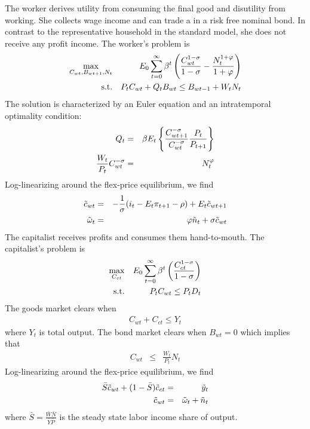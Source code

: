 The worker derives utility from consuming the final good and disutility from working. She collects wage income and can trade a in a risk free nominal bond. In contrast to the representative household in the standard model, she does not receive any profit income. The worker's problem is
\begin{eqnarray}
\max_{C_{wt}, B_{wt+1}, N_t} && E_0 \sum_{t=0}^{\infty} \beta^t \left( \frac{C_{wt}^{1-\sigma}}{1-\sigma}-\frac{N_t^{1+\varphi}}{1+\varphi}\right) \nonumber \\
\lb{worker_bc}
\text{s.t.} && P_t C_{wt} + Q_{t} B_{wt} \leq B_{wt-1} + W_t N_t \nonumber
\end{eqnarray} 
The solution is characterized by an Euler equation and an intratemporal optimality condition:
\begin{eqnarray}
\lb{wc_euler}
Q_{t} &=& \beta E_t \left\{\frac{C^{-\sigma }_{wt+1}}{C^{-\sigma }_{wt}} \nonumber \frac{P_t}{P_{t+1}}\right\} \\
\lb{wc_labor}
\frac{W_t}{P_t}C_{wt}^{-\sigma} &=& N_t^{\varphi} \nonumber
\end{eqnarray}
Log-linearizing around the flex-price equilibrium, we find 
\begin{eqnarray}
\lb{wc_euler_log}
\tilde c_{wt} &=& -\frac{1}{\sigma}(i_t-E_t \pi_{t+1}-\rho) + E_t \tilde c_{wt+1} \\
\lb{wc_labor_log}
\tilde{\omega}_t &=& \varphi \tilde n_t + \sigma \tilde c_{wt}
\end{eqnarray}
The capitalist receives profits and consumes them hand-to-mouth. The capitalist's problem is  
\begin{eqnarray}
\max_{C_{ct}} && E_0 \sum_{t=0}^{\infty} \beta^t \left( \frac{C_{ct}^{1-\sigma}}{1-\sigma}\right) \nonumber \\
\lb{worker_bc}
\text{s.t.} && P_t C_{wt} \leq P_t D_t \nonumber
\end{eqnarray}
The goods market clears when
\begin{eqnarray}
C_{wt}+C_{ct} \leq Y_t \nonumber
\end{eqnarray}
where $Y_t$ is total output.  The bond market clears when $B_{wt} = 0$ which implies that 
\begin{eqnarray}
C_{wt} &\leq& \frac{W_t}{P_t}N_t \nonumber
\end{eqnarray}
Log-linearizing around the flex-price equilibrium, we find 
\begin{eqnarray}
\lb{wc_mcgoods_log}
\bar S \tilde c_{wt}+ (1-\bar S) \tilde c_{ct} &=& \tilde y_t \\
\lb{wc_mcbonds_log}
\tilde c_{wt} &=& \tilde \omega_t + \tilde n_t
\end{eqnarray}
where $\bar S=\frac{\bar W \bar N}{\bar Y \bar P}$ is the steady state labor income share of output.

